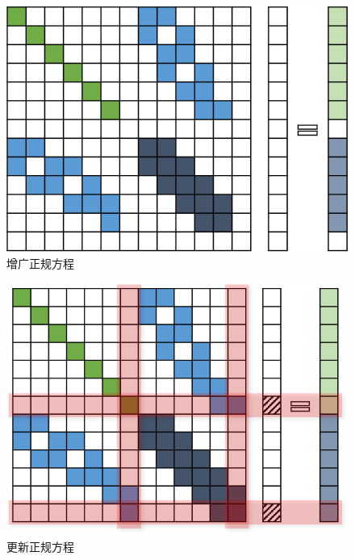 \begin{figure}[htb!]
    \centering
    \includegraphics{figs/normal_eq_aug.png}
    \caption{增广正规方程}
\end{figure}

\begin{figure}[htb!]
    \centering
    \includegraphics{figs/normal_eq_update.png}
    \caption{更新正规方程}
\end{figure}

